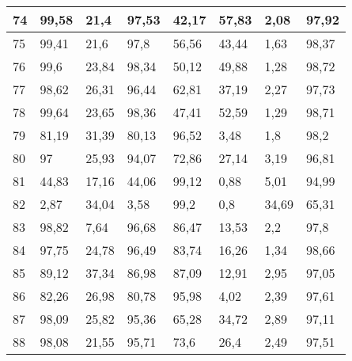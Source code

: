 \begin{longtable}[c]{|l|l|l|l|l|l|l|l|}
74              & 99,58        & 21,4         & 97,53       & 42,17         & 57,83         & 2,08          & 97,92         \\ \hline
75              & 99,41        & 21,6         & 97,8        & 56,56         & 43,44         & 1,63          & 98,37         \\ \hline
76              & 99,6         & 23,84        & 98,34       & 50,12         & 49,88         & 1,28          & 98,72         \\ \hline
77              & 98,62        & 26,31        & 96,44       & 62,81         & 37,19         & 2,27          & 97,73         \\ \hline
78              & 99,64        & 23,65        & 98,36       & 47,41         & 52,59         & 1,29          & 98,71         \\ \hline
79              & 81,19        & 31,39        & 80,13       & 96,52         & 3,48          & 1,8           & 98,2          \\ \hline
80              & 97           & 25,93        & 94,07       & 72,86         & 27,14         & 3,19          & 96,81         \\ \hline
81              & 44,83        & 17,16        & 44,06       & 99,12         & 0,88          & 5,01          & 94,99         \\ \hline
82              & 2,87         & 34,04        & 3,58        & 99,2          & 0,8           & 34,69         & 65,31         \\ \hline
83              & 98,82        & 7,64         & 96,68       & 86,47         & 13,53         & 2,2           & 97,8          \\ \hline
84              & 97,75        & 24,78        & 96,49       & 83,74         & 16,26         & 1,34          & 98,66         \\ \hline
85              & 89,12        & 37,34        & 86,98       & 87,09         & 12,91         & 2,95          & 97,05         \\ \hline
86              & 82,26        & 26,98        & 80,78       & 95,98         & 4,02          & 2,39          & 97,61         \\ \hline
87              & 98,09        & 25,82        & 95,36       & 65,28         & 34,72         & 2,89          & 97,11         \\ \hline
88              & 98,08        & 21,55        & 95,71       & 73,6          & 26,4          & 2,49          & 97,51         \\ \hline

\end{longtable}
